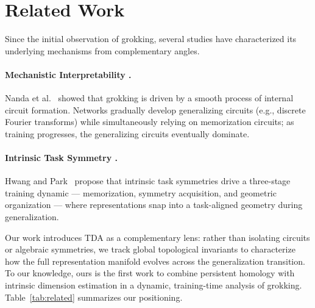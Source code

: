 \section{Related Work}

Since the initial observation of grokking, several studies have characterized its underlying mechanisms from complementary angles.

\paragraph{Mechanistic Interpretability \cite{nanda2023progressmeasuresgrokkingmechanistic}.}
Nanda et al.~\cite{nanda2023progressmeasuresgrokkingmechanistic} showed that grokking is driven by a smooth process of internal circuit formation. Networks gradually develop generalizing circuits (e.g., discrete Fourier transforms) while simultaneously relying on memorization circuits; as training progresses, the generalizing circuits eventually dominate.

\paragraph{Intrinsic Task Symmetry \cite{hwang2026intrinsic}.}
Hwang and Park~\cite{hwang2026intrinsic} propose that intrinsic task symmetries drive a three-stage training dynamic --- memorization, symmetry acquisition, and geometric organization --- where representations snap into a task-aligned geometry during generalization.

Our work introduces TDA as a complementary lens: rather than isolating circuits or algebraic symmetries, we track global topological invariants to characterize how the full representation manifold evolves across the generalization transition. To our knowledge, ours is the first work to combine persistent homology with intrinsic dimension estimation in a dynamic, training-time analysis of grokking. Table~\ref{tab:related} summarizes our positioning.

